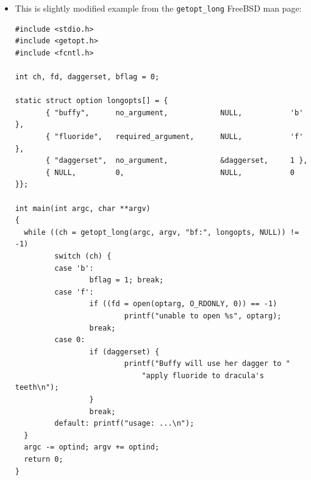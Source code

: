 \begin{itemize}
\item This is slightly modified example from the \texttt{getopt\_long}
FreeBSD man page:
{\footnotesize
\begin{verbatim}
#include <stdio.h>
#include <getopt.h>
#include <fcntl.h>

int ch, fd, daggerset, bflag = 0;

static struct option longopts[] = {
       { "buffy",      no_argument,            NULL,           'b' },
       { "fluoride",   required_argument,      NULL,           'f' },
       { "daggerset",  no_argument,            &daggerset,     1 },
       { NULL,         0,                      NULL,           0 }};

int main(int argc, char **argv)
{
  while ((ch = getopt_long(argc, argv, "bf:", longopts, NULL)) != -1)
         switch (ch) {
         case 'b':
                 bflag = 1; break;
         case 'f':
                 if ((fd = open(optarg, O_RDONLY, 0)) == -1)
                         printf("unable to open %s", optarg);
                 break;
         case 0:
                 if (daggerset) {
                         printf("Buffy will use her dagger to "
                             "apply fluoride to dracula's teeth\n");
                 }
                 break;
         default: printf("usage: ...\n");
  }
  argc -= optind; argv += optind;
  return 0;
}
\end{verbatim}
}
\end{itemize}


\begin{slide}

\end{slide}

